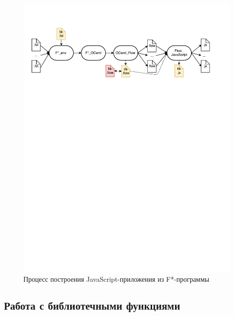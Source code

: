 \begin{figure}[h!]
\begin{center}
\includegraphics[width=\textwidth]{Polubelova/Workflow}
\caption{Процесс построения JavaScript-приложения из F*-программы}
\label{fig:modules} 
\end{center}
\end{figure}

\subsection{Работа с библиотечными функциями}

